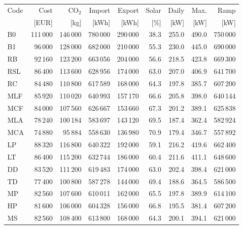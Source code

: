 \clearpage
\noindent\begin{minipage}{\textwidth}\singlespacing\captionsetup{font=footnotesize}
\setlength{\tabcolsep}{4pt}
\renewcommand{\arraystretch}{1.0}
\label{tab:full-scorecard-5-0}
\fontsize{8}{9}\selectfont
\begin{tabular*}{\textwidth}{@{\extracolsep{\fill}}lrrrrrrrr@{}}
\toprule
Code & Cost & CO$_2$ & Import & Export & Solar & Daily & Max. & Ramp\\
 & [EUR] & [kg] & [kWh] & [kWh] & [\%] & [kW] & [kW] & [kW]\\
\midrule
B0 & 111\,000 & 146\,000 & 780\,000 & 290\,000 & 38.3 & 255.0 & 490.0 & 750\,000\\
B1 & 96\,000 & 128\,000 & 682\,000 & 210\,000 & 55.3 & 230.0 & 445.0 & 690\,000\\
RB & 92\,160 & 123\,200 & 663\,056 & 204\,000 & 56.6 & 218.5 & 423.8 & 669\,300\\
RSL & 86\,400 & 113\,600 & 628\,956 & 174\,000 & 63.0 & 207.0 & 406.9 & 641\,700\\
RC & 84\,480 & 110\,800 & 617\,589 & 168\,000 & 64.3 & 197.8 & 385.7 & 607\,200\\
MLF & 85\,920 & 110\,020 & 640\,993 & 157\,170 & 66.6 & 205.8 & 398.0 & 640\,144\\
MCF & 84\,000 & 107\,560 & 626\,667 & 153\,660 & 67.3 & 201.2 & 389.1 & 625\,838\\
MLA & 78\,240 & 100\,184 & 583\,697 & 143\,120 & 69.5 & 187.4 & 362.4 & 582\,924\\
MCA & 74\,880 & 95\,884 & 558\,630 & 136\,980 & 70.9 & 179.4 & 346.7 & 557\,892\\
LP & 88\,320 & 116\,800 & 640\,322 & 192\,000 & 59.1 & 216.2 & 419.6 & 662\,400\\
LT & 86\,400 & 115\,200 & 632\,744 & 186\,000 & 60.4 & 211.6 & 411.1 & 648\,600\\
DD & 83\,520 & 111\,200 & 619\,483 & 174\,000 & 63.0 & 202.4 & 398.4 & 621\,000\\
TD & 77\,400 & 100\,800 & 587\,278 & 144\,000 & 69.4 & 188.6 & 364.5 & 586\,500\\
MP & 82\,560 & 107\,600 & 610\,011 & 162\,000 & 65.5 & 197.8 & 389.9 & 614\,100\\
HP & 81\,600 & 106\,000 & 604\,328 & 156\,000 & 66.8 & 195.5 & 381.4 & 607\,200\\
MS & 82\,560 & 108\,400 & 613\,800 & 168\,000 & 64.3 & 200.1 & 394.1 & 621\,000\\

\end{tabular*}
\end{minipage}
